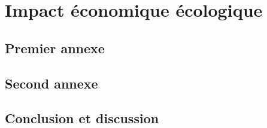 \documentclass[12pt, a4paper, oneside]{book}
\begin{document}
    \part{Impact économique écologique}
 
    \appendix
 
    \chapter{Premier annexe}
    \chapter{Second annexe}
 
    
    \backmatter
 
    \chapter{Conclusion et discussion}
 
    
    \tableofcontents

    
    
 
\end{document}
